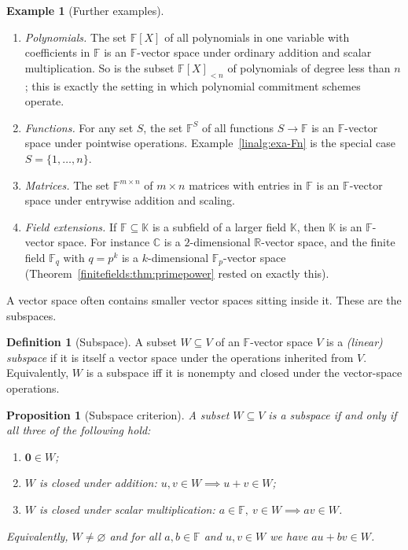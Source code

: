 \documentclass[11pt,a4paper]{article}
\newtheorem{proposition}[theorem]{Proposition}
\theoremstyle{definition}
\newtheorem{definition}[theorem]{Definition}
\newtheorem{example}[theorem]{Example}
\theoremstyle{remark}
\newcommand{\R}{\ensuremath{\mathbb{R}}}
\providecommand{\C}{}\renewcommand{\C}{\ensuremath{\mathbb{C}}}
\newcommand{\F}{\ensuremath{\mathbb{F}}}
\newcommand{\Fp}{\ensuremath{\mathbb{F}_{p}}}
\newcommand{\Fq}{\ensuremath{\mathbb{F}_{q}}}
\begin{document}
\begin{example}[Further examples]\label{linalg:exa-more}
\begin{enumerate}
\item \emph{Polynomials.} The set \(\F[X]\) of all polynomials in one variable with coefficients in \(\F\) is an \(\F\)-vector space under ordinary addition and scalar multiplication. So is the subset \(\F[X]_{<n}\) of polynomials of degree less than \(n\); this is exactly the setting in which polynomial commitment schemes operate.
\item \emph{Functions.} For any set \(S\), the set \(\F^S\) of all functions \(S \to \F\) is an \(\F\)-vector space under pointwise operations. Example~\ref{linalg:exa-Fn} is the special case \(S = \{1, \dots, n\}\).
\item \emph{Matrices.} The set \(\F^{m \times n}\) of \(m \times n\) matrices with entries in \(\F\) is an \(\F\)-vector space under entrywise addition and scaling.
\item \emph{Field extensions.} If \(\F \subseteq \mathbb{K}\) is a subfield of a larger field \(\mathbb{K}\), then \(\mathbb{K}\) is an \(\F\)-vector space. For instance \(\C\) is a \(2\)-dimensional \(\R\)-vector space, and the finite field \(\Fq\) with \(q = p^k\) is a \(k\)-dimensional \(\Fp\)-vector space (Theorem~\ref{finitefields:thm:primepower} rested on exactly this).
\end{enumerate}
\end{example}

A vector space often contains smaller vector spaces sitting inside it. These are the subspaces.

\begin{definition}[Subspace]\label{linalg:def-subspace}
A subset \(W \subseteq V\) of an \(\F\)-vector space \(V\) is a \emph{(linear) subspace} if it is itself a vector space under the operations inherited from \(V\). Equivalently, \(W\) is a subspace iff it is nonempty and closed under the vector-space operations.
\end{definition}

\begin{proposition}[Subspace criterion]\label{linalg:prop-subspace}
A subset \(W \subseteq V\) is a subspace if and only if all three of the following hold:
\begin{enumerate}
\item \(\mathbf{0} \in W\);
\item \(W\) is closed under addition: \(u, v \in W \implies u + v \in W\);
\item \(W\) is closed under scalar multiplication: \(a \in \F,\ v \in W \implies a v \in W\).
\end{enumerate}
Equivalently, \(W \neq \varnothing\) and for all \(a, b \in \F\) and \(u, v \in W\) we have \(a u + b v \in W\).
\end{proposition}
\end{document}
